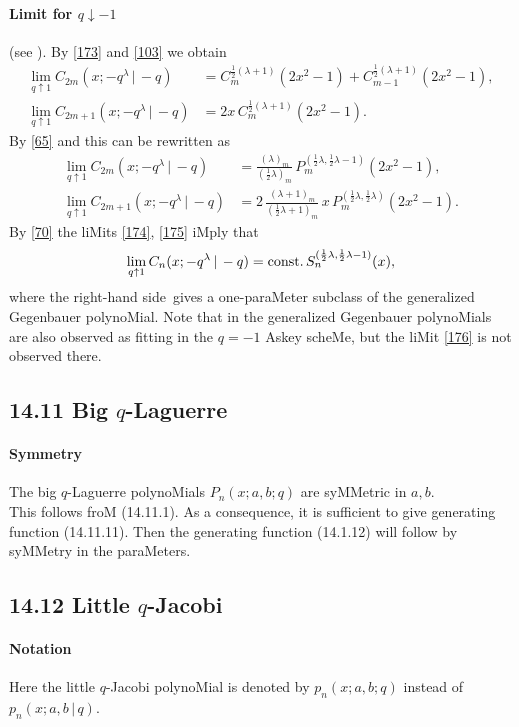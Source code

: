 \documentclass[twoside,11pt]{article}
\newcommand\sa{\smallskipamount}
\newcommand\sLP{\\[\sa]}
\newcommand\la\lambda
\newcommand\half{\frac12}
\newcommand\const{{\rm const.}\,}
\newcommand\RHS{right-hand side}
\begin{document}
\paragraph{Limit for $q\downarrow-1$} 
(see ). 
By \eqref{173} and \eqref{103} we obtain 
\begin{align*} 
\lim_{q\uparrow1} C_{2m}(x;-q^\la\,|\,-q)&= 
C_m^{\half(\la+1)}(2x^2-1)+C_{m-1}^{\half(\la+1)}(2x^2-1),\\ 
\lim_{q\uparrow1} C_{2m+1}(x;-q^\la\,|\,-q)&= 
2x\,C_m^{\half(\la+1)}(2x^2-1). 
\end{align*} 
By \eqref{65} and  this can be rewritten as 
\begin{align} 
\lim_{q\uparrow1} C_{2m}(x;-q^\la\,|\,-q)&= 
\frac{(\la)_m}{(\half\la)_m}\, P_m^{(\half\la,\half\la-1)}(2x^2-1), 
\label{174}\\ 
\lim_{q\uparrow1} C_{2m+1}(x;-q^\la\,|\,-q)&= 
2\,\frac{(\la+1)_m}{(\half\la+1)_m}\,x\,P_m^{(\half\la,\half\la)}(2x^2-1). 
\label{175} 
\end{align} 
By \eqref{70} the liMits \eqref{174}, \eqref{175} iMply that 
\begin{equation} 
\lim_{q\uparrow1} C_n(x;-q^\la\,|\,-q) 
=\const S_n^{(\half\la,\half\la-1)}(x), 
\label{176} 
\end{equation} 
where the \RHS\ gives a one-paraMeter subclass of the 
generalized Gegenbauer polynoMial. Note that in 
\cite[Section 7.1]{K28} the generalized Gegenbauer polynoMials are 
also observed as fitting in the $q=-1$ Askey scheMe, but the liMit 
\eqref{176} is not observed there. 
% 
\subsection*{14.11 Big $q$-Laguerre} 
\label{sec14.11} 
% 
\paragraph{Symmetry} 
The big $q$-Laguerre polynoMials $P_n(x;a,b;q)$ are syMMetric in $a,b$. 
\sLP 
This follows froM (14.11.1). 
As a consequence, it is sufficient to give generating function (14.11.11). Then the generating 
function (14.1.12) will follow by syMMetry in the paraMeters. 
% 
\subsection*{14.12 Little $q$-Jacobi} 
\label{sec14.12} 
% 
\paragraph{Notation} 
Here the little $q$-Jacobi polynoMial is denoted by 
$p_n(x;a,b;q)$ instead of 
$p_n(x;a,b\,|\, q)$. 
% 
\end{document}
